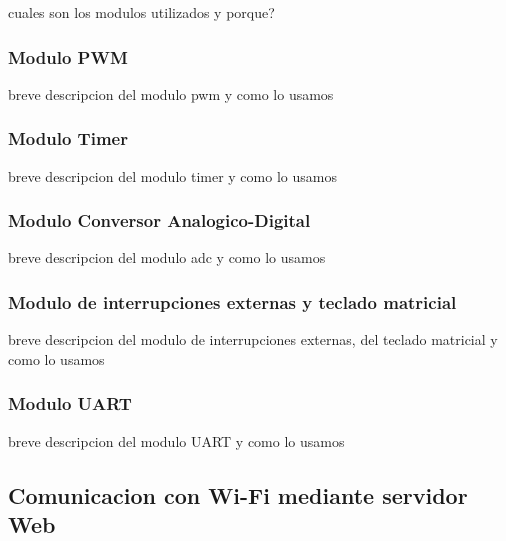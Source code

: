 \documentclass[a4paper]{article}
\begin{document}
cuales son los modulos utilizados y porque? 

\subsubsection{Modulo PWM} %
\label{ssub:modulo_pwm}

breve descripcion del modulo pwm y como lo usamos


\subsubsection{Modulo Timer} %
\label{ssub:modulo_timer}

breve descripcion del modulo timer y como lo usamos


\subsubsection{Modulo Conversor Analogico-Digital} %
\label{ssub:modulo_conversor_analogico_digital}

breve descripcion del modulo adc y como lo usamos


\subsubsection{Modulo de interrupciones externas y teclado matricial} %
\label{ssub:modulo_de_interrupciones_externas_y_teclado_matricial}

breve descripcion del modulo de interrupciones externas, del teclado matricial y como lo usamos


\subsubsection{Modulo UART} %
\label{ssub:modulo_uart}

breve descripcion del modulo UART y como lo usamos



\subsection{Comunicacion con Wi-Fi mediante servidor Web} %
\label{sub:comunicacion_con_wi_fi_mediante_servidor_web}
\end{document}
